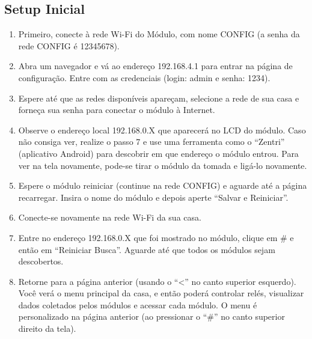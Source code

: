 \subsection{Setup Inicial}
\begin{enumerate}
	\item Primeiro, conecte à rede Wi-Fi do Módulo, com nome CONFIG (a senha da rede CONFIG é 12345678).
	\item Abra um navegador e vá ao endereço 192.168.4.1 para entrar na página de configuração. Entre com as credenciais (login: admin e senha: 1234).
	\item Espere até que as redes disponíveis apareçam, selecione a rede de sua casa e forneça sua senha para conectar o módulo à Internet.
	\item Observe o endereço local 192.168.0.X que aparecerá no LCD do módulo. Caso não consiga ver, realize o passo 7 e use uma ferramenta como o “Zentri” (aplicativo Android) para descobrir em que endereço o módulo entrou. Para ver na tela novamente, pode-se tirar o módulo da tomada e ligá-lo novamente.
	\item Espere o módulo reiniciar (continue na rede CONFIG) e aguarde até a página recarregar. Insira o nome do módulo e depois aperte “Salvar e Reiniciar”.
	\item Conecte-se novamente na rede Wi-Fi da sua casa.
	\item Entre no endereço 192.168.0.X que foi mostrado no módulo, clique em \# e então em “Reiniciar Busca”. Aguarde até que todos os módulos sejam descobertos.
	\item Retorne para a página anterior (usando o “\textless” no canto superior esquerdo). Você verá o menu principal da casa, e então poderá controlar relés, visualizar dados coletados pelos módulos e acessar cada módulo. O menu é personalizado na página anterior (ao pressionar o “\#” no canto superior direito da tela).
\end{enumerate}
